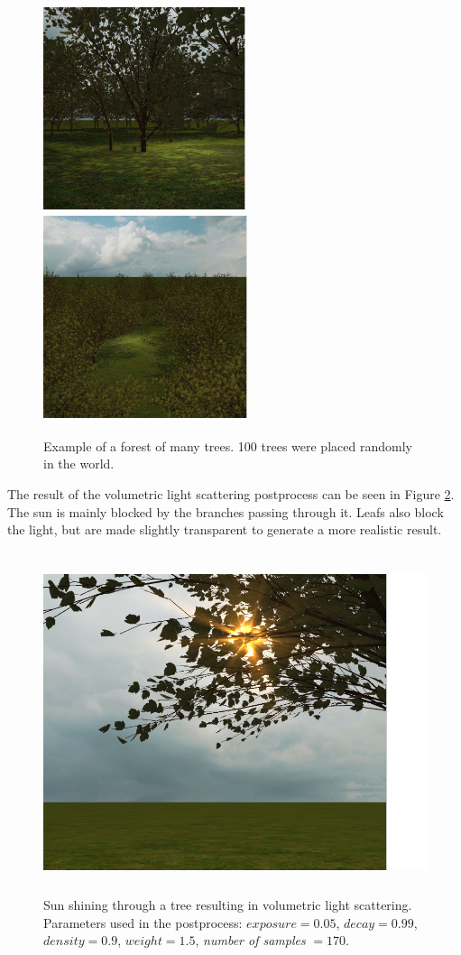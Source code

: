 \documentclass{article}
\begin{document}
	  	\begin{figure}[h!]
	  		\centering
	  		\includegraphics[height=6cm]{benttree}
	  		\includegraphics[height=6cm]{forrest}
	  		\caption{Example of a forest of many trees. 100 trees were placed randomly in the world.}
	  		\label{fig:forest}
	  	\end{figure}
	 
	 	The result of the volumetric light scattering postprocess can be seen in Figure \ref{fig:godrays}. The sun is mainly blocked by the branches passing through it. Leafs also block the light, but are made slightly transparent to generate a more realistic result. 
	 
		\begin{figure}[h!]
			\centering
		 	\includegraphics[height=10cm]{godrays}
		 	\caption{Sun shining through a tree resulting in volumetric light scattering. Parameters used in the postprocess: $exposure=0.05$, $decay=0.99$, $density=0.9$, $weight=1.5$, \textit{number of samples} $=170$.}
		 	\label{fig:godrays}
		\end{figure}
  	
\end{document}
